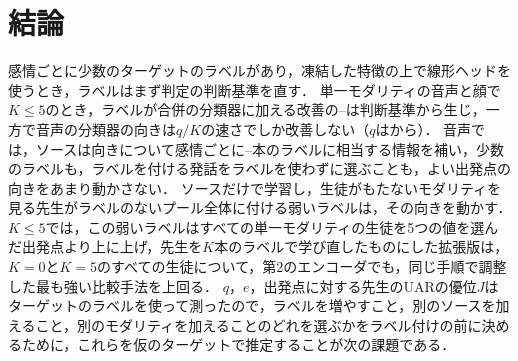 \section{結論}
\label{sec:conclusion}

感情ごとに少数のターゲットのラベルがあり，凍結した特徴の上で線形ヘッドを使うとき，ラベルはまず判定の判断基準を直す．
単一モダリティの音声と顔で$K \le 5$のとき，ラベルが合併の分類器に加える改善の--は判断基準から生じ，一方で音声の分類器の向きは$q/K$の速さでしか改善しない（$q$はから）．
音声では，ソースは向きについて感情ごとに--本のラベルに相当する情報を補い，少数のラベルも，ラベルを付ける発話をラベルを使わずに選ぶことも，よい出発点の向きをあまり動かさない．
ソースだけで学習し，生徒がもたないモダリティを見る先生がラベルのないプール全体に付ける弱いラベルは，その向きを動かす．
$K \le 5$では，この弱いラベルはすべての単一モダリティの生徒を5つの値を選んだ出発点より上に上げ，先生を$K$本のラベルで学び直したものにした拡張版は，$K=0$と$K=5$のすべての生徒について，第2のエンコーダでも，同じ手順で調整した最も強い比較手法を上回る．
$q$，$e$，出発点に対する先生のUARの優位$J$はターゲットのラベルを使って測ったので，ラベルを増やすこと，別のソースを加えること，別のモダリティを加えることのどれを選ぶかをラベル付けの前に決めるために，これらを仮のターゲットで推定することが次の課題である．
